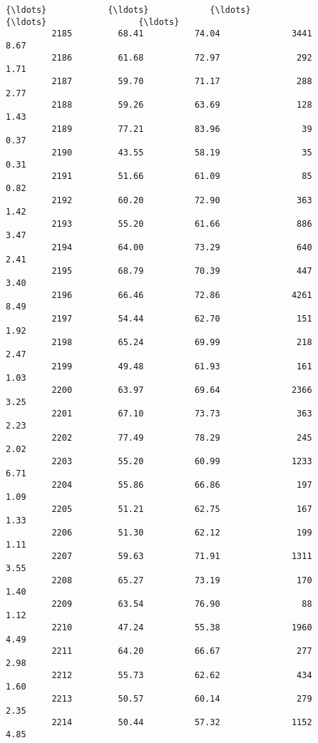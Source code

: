 \documentclass[11pt]{llncs}
\begin{document}
\begin{Verbatim}[commandchars=\\\{\}]
         {\ldots}            {\ldots}            {\ldots}               {\ldots}                  {\ldots}   
         2185         68.41          74.04              3441                 8.67   
         2186         61.68          72.97               292                 1.71   
         2187         59.70          71.17               288                 2.77   
         2188         59.26          63.69               128                 1.43   
         2189         77.21          83.96                39                 0.37   
         2190         43.55          58.19                35                 0.31   
         2191         51.66          61.09                85                 0.82   
         2192         60.20          72.90               363                 1.42   
         2193         55.20          61.66               886                 3.47   
         2194         64.00          73.29               640                 2.41   
         2195         68.79          70.39               447                 3.40   
         2196         66.46          72.86              4261                 8.49   
         2197         54.44          62.70               151                 1.92   
         2198         65.24          69.99               218                 2.47   
         2199         49.48          61.93               161                 1.03   
         2200         63.97          69.64              2366                 3.25   
         2201         67.10          73.73               363                 2.23   
         2202         77.49          78.29               245                 2.02   
         2203         55.20          60.99              1233                 6.71   
         2204         55.86          66.86               197                 1.09   
         2205         51.21          62.75               167                 1.33   
         2206         51.30          62.12               199                 1.11   
         2207         59.63          71.91              1311                 3.55   
         2208         65.27          73.19               170                 1.40   
         2209         63.54          76.90                88                 1.12   
         2210         47.24          55.38              1960                 4.49   
         2211         64.20          66.67               277                 2.98   
         2212         55.73          62.62               434                 1.60   
         2213         50.57          60.14               279                 2.35   
         2214         50.44          57.32              1152                 4.85   
         

\end{Verbatim}
\end{document}
